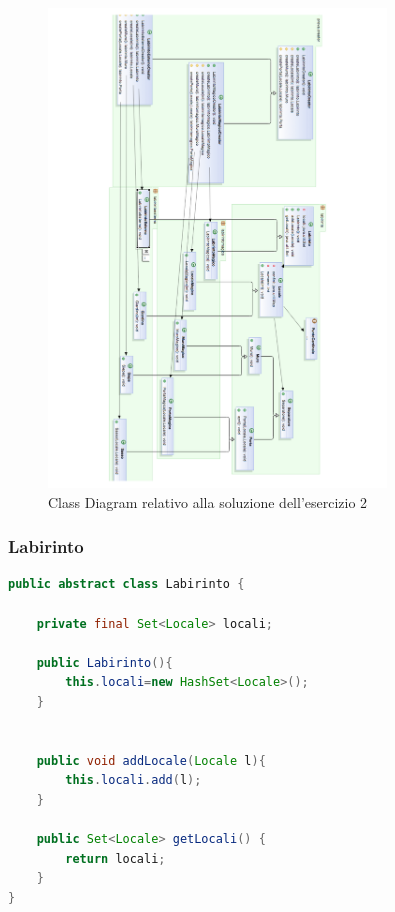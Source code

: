 \documentclass{article}
\begin{document}
\begin{figure}
\includegraphics[width=0.8\textwidth]{Img/AbstractFactoryLabirinti2.pdf}
\caption{Class Diagram relativo alla soluzione dell'esercizio 2}
\label{Fig:labirintoMagico}
\end{figure}

\subsubsection{Labirinto}
\begin{lstlisting}[language=Java]
public abstract class Labirinto {

	private final Set<Locale> locali;
	
	public Labirinto(){
		this.locali=new HashSet<Locale>();
	}

	
	public void addLocale(Locale l){
		this.locali.add(l);
	}

	public Set<Locale> getLocali() {
		return locali;
	}
}
\end{lstlisting}
\end{document}

